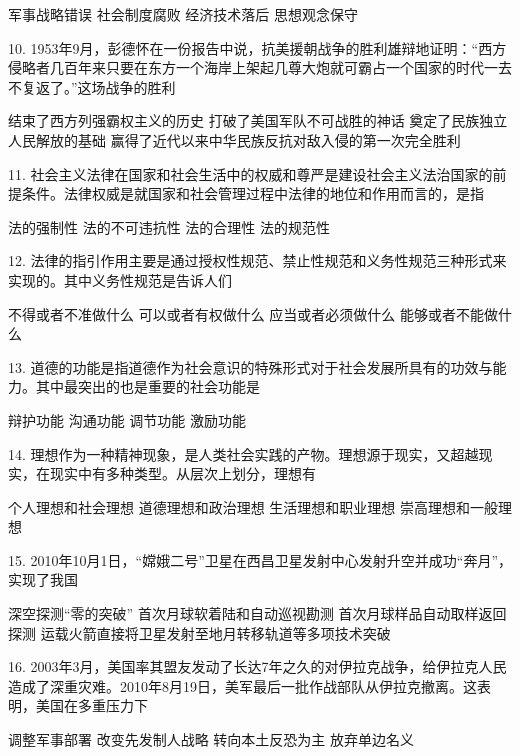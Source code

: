 \begin{choices}
	 军事战略错误
	 社会制度腐败
	 经济技术落后
	 思想观念保守
\end{choices}
10. 1953年9月，彭德怀在一份报告中说，抗美援朝战争的胜利雄辩地证明：“西方侵略者几百年来只要在东方一个海岸上架起几尊大炮就可霸占一个国家的时代一去不复返了。”这场战争的胜利
\begin{choices}
	 结束了西方列强霸权主义的历史
	 打破了美国军队不可战胜的神话
	 奠定了民族独立人民解放的基础
	 赢得了近代以来中华民族反抗对敌入侵的第一次完全胜利
\end{choices}
11. 社会主义法律在国家和社会生活中的权威和尊严是建设社会主义法治国家的前提条件。法律权威是就国家和社会管理过程中法律的地位和作用而言的，是指
\begin{choices}
	 法的强制性
	 法的不可违抗性
	 法的合理性
	 法的规范性
\end{choices}
12. 法律的指引作用主要是通过授权性规范、禁止性规范和义务性规范三种形式来实现的。其中义务性规范是告诉人们
\begin{choices}
	 不得或者不准做什么
	 可以或者有权做什么
	 应当或者必须做什么
	 能够或者不能做什么
\end{choices}
13. 道德的功能是指道德作为社会意识的特殊形式对于社会发展所具有的功效与能力。其中最突出的也是重要的社会功能是
\begin{choices}
	 辩护功能
	 沟通功能
	 调节功能
	 激励功能
\end{choices}
14. 理想作为一种精神现象，是人类社会实践的产物。理想源于现实，又超越现实，在现实中有多种类型。从层次上划分，理想有
\begin{choices}
	 个人理想和社会理想
	 道德理想和政治理想
	 生活理想和职业理想
	 崇高理想和一般理想
\end{choices}
15. 2010年10月1日，“嫦娥二号”卫星在西昌卫星发射中心发射升空并成功“奔月”，实现了我国
\begin{choices}
	 深空探测“零的突破”
	 首次月球软着陆和自动巡视勘测
	 首次月球样品自动取样返回探测
	 运载火箭直接将卫星发射至地月转移轨道等多项技术突破
\end{choices}
16. 2003年3月，美国率其盟友发动了长达7年之久的对伊拉克战争，给伊拉克人民造成了深重灾难。2010年8月19日，美军最后一批作战部队从伊拉克撤离。这表明，美国在多重压力下
\begin{choices}
	 调整军事部署
	 改变先发制人战略
	 转向本土反恐为主
	 放弃单边名义
\end{choices}
\vspace{6pt}
